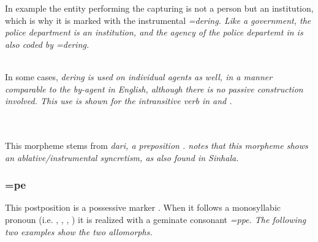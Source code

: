 In example  the entity performing the capturing is not a person but an institution, which is why it is marked with the instrumental \em =dering\em.
Like a government, the police department is an institution, and the agency of the police departemt in  is also coded by \em =dering\em.

 \\
In some cases, \em dering \em is used on individual agents as well, in a manner comparable to the \em by-agent \em in English, although there is no passive construction involved. This use is shown for the intransitive verb  in  and .


 \\
 \\
This morpheme  stems from \em *dari\em, a preposition \citep[141]{Bakker2006}.
\citet{Ansaldo2005ms} notes that this morpheme shows an ablative/instrumental syncretism, as also found in Sinhala.




\subsubsection{=pe}\label{sec:morph:=pe}
This postposition  is a possessive marker
\citep{SmithEtAl2004,
Ansaldo2005ms,%
Ansaldo2008genesis,%
Ansaldo2009}. When it follows a monosyllabic pronoun (i.e.
,
,
,
)
it is realized with a geminate consonant \em =ppe\em. The following two examples show the two allomorphs.
 
